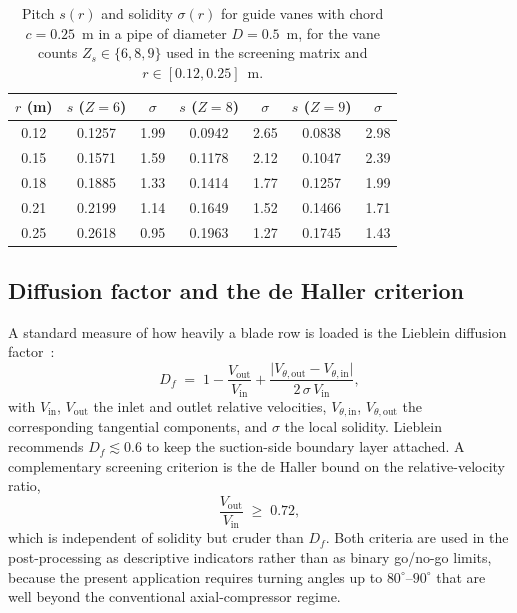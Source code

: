 \begin{table}[h!]
\centering
\caption[Pitch and solidity for selected vane counts]{Pitch $s(r)$ and solidity $\sigma(r)$ for guide vanes with chord $c = 0.25$~m in a pipe of diameter $D = 0.5$~m, for the vane counts $Z_s \in \{6,8,9\}$ used in the screening matrix and $r \in [0.12, 0.25]$~m.}
\label{tab:pitch_solidity_design}
\small
\begin{tabular}{c|cc|cc|cc}
\toprule
\textbf{$r$ (m)} & $s$ ($Z{=}6$) & $\sigma$ & $s$ ($Z{=}8$) & $\sigma$ & $s$ ($Z{=}9$) & $\sigma$ \\
\midrule
0.12 & 0.1257 & 1.99 & 0.0942 & 2.65 & 0.0838 & 2.98 \\
0.15 & 0.1571 & 1.59 & 0.1178 & 2.12 & 0.1047 & 2.39 \\
0.18 & 0.1885 & 1.33 & 0.1414 & 1.77 & 0.1257 & 1.99 \\
0.21 & 0.2199 & 1.14 & 0.1649 & 1.52 & 0.1466 & 1.71 \\
0.25 & 0.2618 & 0.95 & 0.1963 & 1.27 & 0.1745 & 1.43 \\
\bottomrule
\end{tabular}
\end{table}
 
\subsection{Diffusion factor and the de Haller criterion}
\label{sec:theory_diffusion}
 
A standard measure of how heavily a blade row is loaded is the Lieblein diffusion factor~\cite{Lieblein1953}:
\begin{equation}
D_f \;=\; 1 - \frac{V_{\mathrm{out}}}{V_{\mathrm{in}}}
       + \frac{\lvert V_{\theta,\mathrm{out}} - V_{\theta,\mathrm{in}} \rvert}
              {2\,\sigma\, V_{\mathrm{in}}},
\label{eq:Df}
\end{equation}
with $V_{\mathrm{in}}$, $V_{\mathrm{out}}$ the inlet and outlet relative velocities, $V_{\theta,\mathrm{in}}$, $V_{\theta,\mathrm{out}}$ the corresponding tangential components, and $\sigma$ the local solidity. Lieblein recommends $D_f \lesssim 0.6$ to keep the suction-side boundary layer attached. A complementary screening criterion is the de Haller bound on the relative-velocity ratio,
\begin{equation}
\frac{V_{\mathrm{out}}}{V_{\mathrm{in}}} \;\geq\; 0.72,
\label{eq:deHaller}
\end{equation}
which is independent of solidity but cruder than $D_f$. Both criteria are used in the post-processing as descriptive indicators rather than as binary go/no-go limits, because the present application requires turning angles up to $80^\circ$--$90^\circ$ that are well beyond the conventional axial-compressor regime.
 
